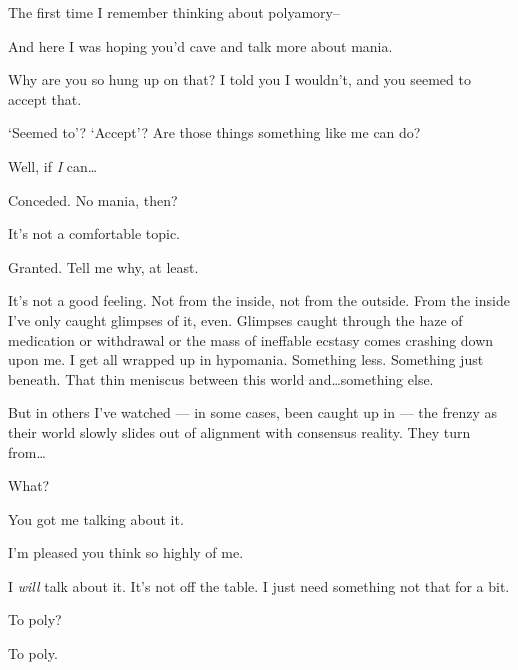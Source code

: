 The first time I remember thinking about polyamory--

\begin{ally}
And here I was hoping you'd cave and talk more about mania.
\end{ally}
Why are you so hung up on that? I told you I wouldn't, and you seemed to accept that.

\begin{ally}
`Seemed to'? `Accept'? Are those things something like me can do?
\end{ally}
Well, if \emph{I} can\ldots{}

\begin{ally}
Conceded. No mania, then?
\end{ally}
It's not a comfortable topic.

\begin{ally}
Granted. Tell me why, at least.
\end{ally}
It's not a good feeling. Not from the inside, not from the outside. From the inside I've only caught glimpses of it, even. Glimpses caught through the haze of medication or withdrawal or the mass of ineffable ecstasy comes crashing down upon me. I get all wrapped up in hypomania. Something less. Something just beneath. That thin meniscus between this world and\ldots{}something else.

But in others I've watched --- in some cases, been caught up in --- the frenzy as their world slowly slides out of alignment with consensus reality. They turn from\ldots{}

\begin{ally}
What?
\end{ally}
You got me talking about it.

\begin{ally}
I'm pleased you think so highly of me.
\end{ally}
I \emph{will} talk about it. It's not off the table. I just need something not that for a bit.

\begin{ally}
To poly?
\end{ally}
To poly.
\newpage
